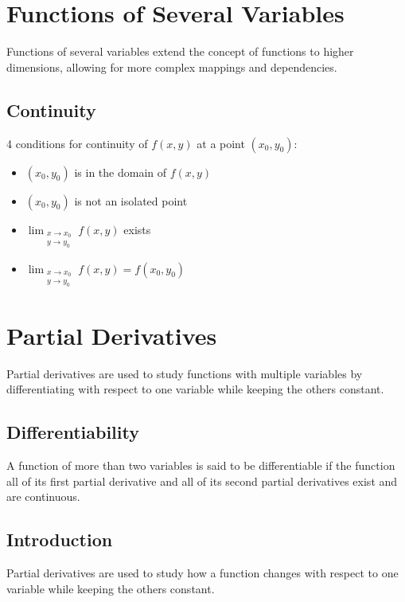 \documentclass[a4paper,12pt,openany]{book}
\begin{document}
\chapter{Functions of Several Variables}
Functions of several variables extend the concept of functions to higher dimensions, allowing for more complex mappings and dependencies.

\section{Continuity}

4 conditions for continuity of $f(x, y)$ at a point $(x_0, y_0)$:

\begin{itemize}
    \item $(x_0, y_0)$ is in the domain of $f(x, y)$
    \item $(x_0, y_0)$ is not an isolated point
    \item $\lim_{\substack{x \to x_0\\y \to y_0}} f(x, y)$ exists
    \item $\lim_{\substack{x \to x_0\\y \to y_0}} f(x, y) = f(x_0, y_0)$
\end{itemize}


\chapter{Partial Derivatives}
Partial derivatives are used to study functions with multiple variables by differentiating with respect to one variable while keeping the others constant.

\section{Differentiability}
A function of more than two variables is said to be
differentiable if the function all of its first partial
derivative and all of its second partial derivatives exist
and are continuous.

\section{Introduction}
Partial derivatives are used to study how a function changes with respect to one variable while keeping the others constant.
\end{document}
